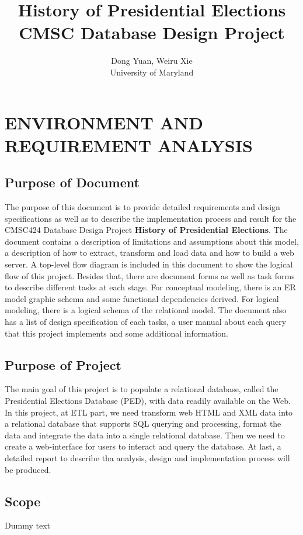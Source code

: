 \documentclass{article}
\title{ 
History of Presidential Elections \\ 
CMSC Database Design Project\\
}
\author{
Dong Yuan, Weiru Xie\\
University of Maryland
}
\date{}
\begin{document}
\maketitle

\tableofcontents
\newpage

\section{ENVIRONMENT AND REQUIREMENT ANALYSIS}
\subsection{Purpose of Document}
The purpose of this document is to provide detailed requirements and design specifications as well as to describe the implementation process and result for the CMSC424 Database Design Project \textbf{History of Presidential Elections}. The document contains a description of limitations and assumptions about this model, a description of how to extract, transform and load data and how to build a web server. A top-level flow diagram is included in this document to show the logical flow of this project. Besides that, there are document forms as well as task forms to describe different tasks at each stage. For conceptual modeling, there is an ER model graphic schema and some functional dependencies derived. For logical modeling, there is a logical schema of the relational model. The document also has a list of design specification of each tasks, a user manual about each query that this project implements and some additional information.

\subsection{Purpose of Project}
The main goal of this project is to populate a relational database, called the Presidential Elections Database (PED), with data readily available on the Web. In this project, at ETL part, we need transform web HTML and XML data into a relational database that supports SQL querying and processing, format the data and integrate the data into a single relational database. Then we need to create a web-interface for users to interact and query the database. At last, a detailed report to describe tha analysis, design and implementation process will be produced.
\subsection{Scope}
Dummy text
\end{document}
